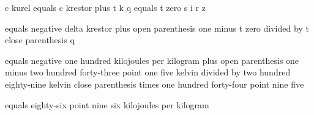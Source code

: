 c kurel equals c krestor plus t k q equals t zero s i r z

equals negative delta krestor plus open parenthesis one minus t zero divided by t close parenthesis q

equals negative one hundred kilojoules per kilogram plus open parenthesis one minus two hundred forty-three point one five kelvin divided by two hundred eighty-nine kelvin close parenthesis times one hundred forty-four point nine five

equals eighty-six point nine six kilojoules per kilogram